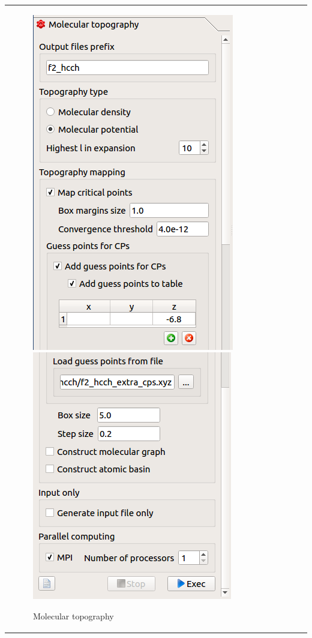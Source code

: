 \documentclass[10pt]{article}
\begin{document}
\begin{tabular}{lcr}
\begin{minipage}{.47\linewidth}
\begin{figure}[H]
\begin{center}
\includegraphics[width=.52\linewidth]{damqt_fig_2_6_1a.png}
\includegraphics[width=.52\linewidth]{damqt_fig_2_6_1b.png}
\end{center}
\caption{Molecular topography \label{fig:2_6_1}}
\end{figure}
\end{minipage}
\end{tabular}
\end{document}
